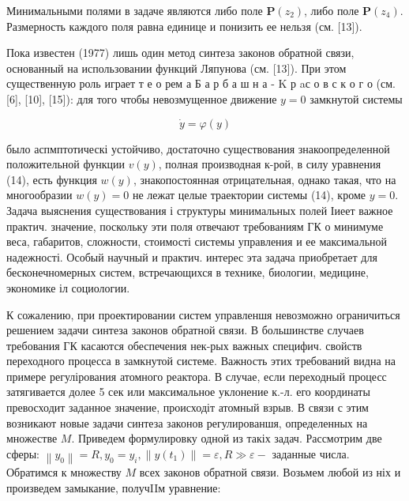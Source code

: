 \documentclass[10pt]{article}
\begin{document}
Минимальными полями в задаче являются либо поле $\boldsymbol{P}\left(z_{2}\right)$, либо поле $\boldsymbol{P}\left(z_{4}\right)$. Размерность каждого поля равна единице и понизить ее нельзя (см. [13]).



Пока известен (1977) лишь один метод синтеза законов обратной связи, основанный на использовании функций Ляпунова (см. [13]). При этом существенную роль играет т е о рем а Б а р б а ш н а - K р aс о в с к о г о (см. [6], [10], [15]): для того чтобы невозмущенное движение $y=0$ замкнутой системы



\[

\dot{y}=\varphi(y)

\]



было аспмптотическі устойчиво, достаточно существования знакоопределенной положительной функции $v(y)$, полная производная к-рой, в силу уравнения (14), есть функция $w(y)$, знакопостоянная отрицательная, однако такая, что на многообразии $w(y)=0$ не лежат целые траектории системы (14), кроме $y=0$. Задача выяснения существования і структуры минимальных полей Іиеет важное практич. значение, поскольку эти поля отвечают требованиям $Г К$ о минимуме веса, габаритов, сложности, стоимості системы управления и ее максимальной надежності. Особый научный и практич. интерес эта задача приобретает для бесконечномерных систем, встречающихся в технике, биологии, медицине, экономике іл социологии.



К сожалению, при проектировании систем управленшя невозможно ограничиться решением задачи синтеза законов обратной связи. В большинстве случаев требования ГК касаются обеспечения нек-рых важных специфич. свойств переходного процесса в замкнутой системе. Важность этих требований видна на примере регулірования атомного реактора. В случае, если переходный процесс затягивается долее 5 сек или максимальное уклонение к.-л. его координаты превосходит заданное значение, происходіт атомный взрыв. В связи с этим возникают новые задачи синтеза законов регулированшя, определенных на множестве $M$. Приведем формулировку одной из такіх задач. Рассмотрим две сферы: $\left\|y_{0}\right\|=R, y_{0}=y_{i},\left\|y\left(t_{1}\right)\right\|=\varepsilon, R \gg \varepsilon-$ заданные числа. Обратимся к множеству $M$ всех законов обратной связи. Возьмем любой из ніх и произведем замыкание, получIIм уравнение:
\end{document}
